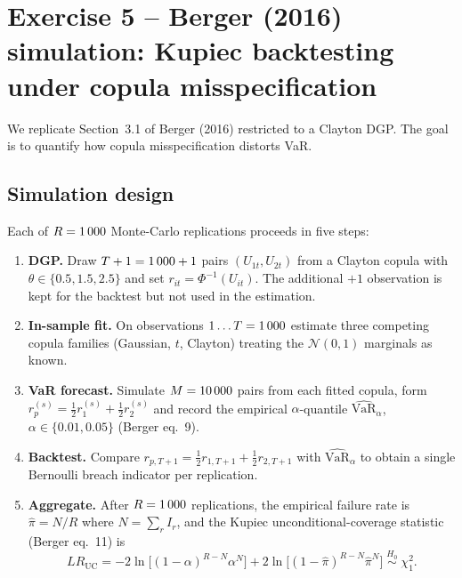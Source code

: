 \section{Exercise 5 -- Berger (2016) simulation: Kupiec backtesting under
copula misspecification}\label{sec:ex5}

We replicate Section~3.1 of Berger (2016) restricted to a Clayton DGP. The
goal is to quantify how copula misspecification distorts VaR.

\subsection{Simulation design}

Each of $R=1\,000$ Monte-Carlo replications proceeds in five steps:

\begin{enumerate}\setlength\itemsep{0pt}
\item \textbf{DGP.} Draw $T+1=1\,000+1$ pairs $(U_{1t},U_{2t})$ from a
      Clayton copula with $\theta\in\{0.5,1.5,2.5\}$ and set
      $r_{it}=\Phi^{-1}(U_{it})$. The additional $+1$ observation is kept for the backtest but not used in the estimation.
\item \textbf{In-sample fit.} On observations $1\ldots T=1\,000$ estimate
      three competing copula families (Gaussian, $t$, Clayton) treating the
      $\mathcal{N}(0,1)$ marginals as known.
\item \textbf{VaR forecast.} Simulate $M=10\,000$ pairs from each fitted
      copula, form $r_p^{(s)}=\tfrac12 r_1^{(s)}+\tfrac12 r_2^{(s)}$ and
      record the empirical $\alpha$-quantile
      $\widehat{\mathrm{VaR}}_\alpha$, $\alpha\in\{0.01,0.05\}$ (Berger eq.~9).
\item \textbf{Backtest.} Compare $r_{p,T+1}=\tfrac12 r_{1,T+1}+\tfrac12 r_{2,T+1}$
      with $\widehat{\mathrm{VaR}}_\alpha$ to obtain a single Bernoulli breach
      indicator per replication.
\item \textbf{Aggregate.} After $R=1\,000$ replications, the empirical failure
      rate is $\hat\pi=N/R$ where $N=\sum_r I_r$, and the Kupiec
      unconditional-coverage statistic (Berger eq.~11) is
      \begin{equation}\label{eq:kupiec}
      LR_{\text{UC}}=-2\ln\bigl[(1-\alpha)^{R-N}\alpha^N\bigr]
                    +2\ln\bigl[(1-\hat\pi)^{R-N}\hat\pi^N\bigr]\;\stackrel{H_0}{\sim}\;\chi^2_1.
      \end{equation}
\end{enumerate}

